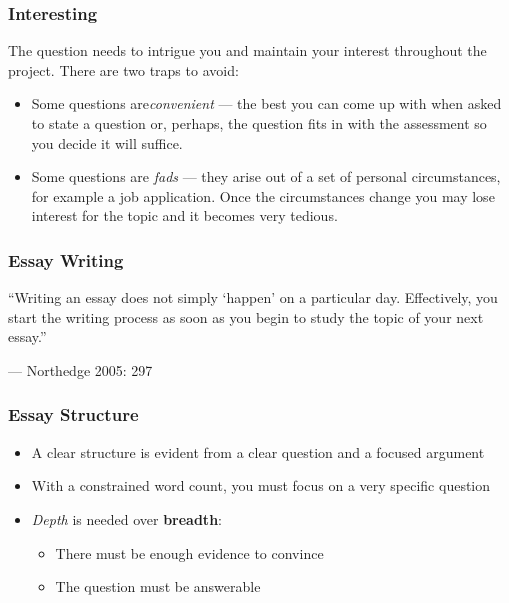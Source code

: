 \begin{frame}
	\frametitle{Interesting}
		
	The question needs to intrigue you and maintain your interest throughout the project. There are two traps to avoid:
	
	\begin{itemize}
		\item Some questions are\textit{convenient} --- the best you can come up with when asked to state a question or, perhaps, the question fits in with the assessment so you decide it will suffice.
		\item Some questions are \textit{fads} --- they arise out of a set of personal circumstances, for example a job application. Once the circumstances change you may lose interest for the topic and it becomes very tedious.
	\end{itemize}
\end{frame}

\begin{frame}
	\frametitle{Essay Writing}
	
	``Writing  an essay does not simply ‘happen’ on a particular day. Effectively, you start the writing process as soon as you begin to study the topic of your next essay.''

	--- Northedge 2005: 297
\end{frame}


\begin{frame}
	\frametitle{Essay Structure}
	
	\begin{itemize}
		\item A clear structure is evident from a clear question and a focused argument
		\item With a constrained word count, you must focus on a very specific question
		\item \textit{Depth} is needed over \textbf{breadth}:
		\begin{itemize}
			\item There must be enough evidence to convince
			\item The question must be answerable	
		\end{itemize}
	\end{itemize}
\end{frame}

